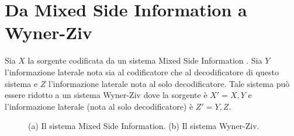 \section{Da Mixed Side Information a Wyner-Ziv}
\label{sec:msi-system-to-wz}

\begin{prop}
    \label{prop:msi-to-wz}

    Sia \(X\) la sorgente codificata da un sistema Mixed Side Information
    \cite{1614094}. Sia \(Y\) l'informazione laterale nota sia al codificatore
    che al decodificatore di questo sistema e \(Z\) l'informazione laterale
    nota al solo decodificatore. Tale sistema può essere ridotto a un sistema
    Wyner-Ziv \cite{1055508} dove la sorgente è \(X'=X,Y\) e l'informazione
    laterale (nota al solo decodificatore) è \(Z'=Y,Z\).
\end{prop}

\begin{figure}[hb]
    \centering
    \begin{subfigure}[b]{0.45\textwidth}
        
        \caption{}
        \label{fig:mini-msi}
    \end{subfigure}
    \begin{subfigure}[b]{0.54\textwidth}
        
        \caption{}
        \label{fig:mini-wz}
    \end{subfigure}
    \caption{
        (a) Il sistema Mixed Side Information.
        (b) Il sistema Wyner-Ziv.
    }
    \label{fig:mini-schemes}
\end{figure}

